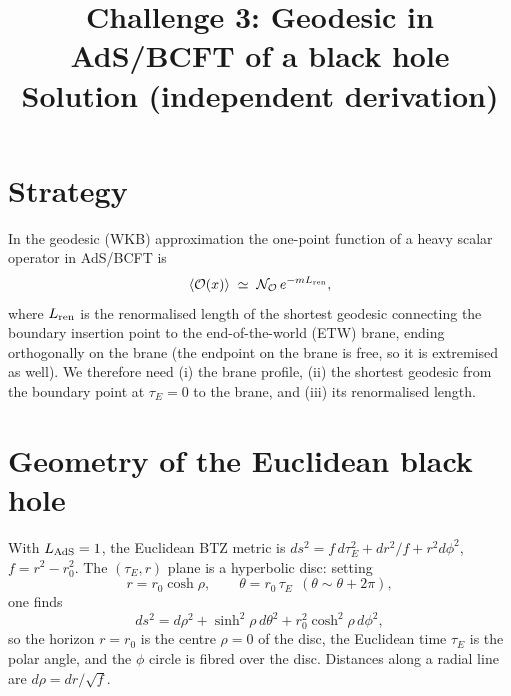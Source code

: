 \documentclass[11pt]{article}
\title{Challenge 3: Geodesic in AdS/BCFT of a black hole \\ \large Solution (independent derivation)}
\date{}
\begin{document}
\maketitle

\section{Strategy}
In the geodesic (WKB) approximation the one-point function of a heavy scalar operator in AdS/BCFT is
\begin{equation}
\langle\mathcal O(x)\rangle\;\simeq\;\mathcal N_{\mathcal O}\,e^{-m L_{\rm ren}},
\label{eq:wkb}
\end{equation}
where $L_{\rm ren}$ is the renormalised length of the shortest geodesic connecting the boundary insertion point to the end-of-the-world (ETW) brane, ending orthogonally on the brane (the endpoint on the brane is free, so it is extremised as well). We therefore need (i) the brane profile, (ii) the shortest geodesic from the boundary point at $\tau_E=0$ to the brane, and (iii) its renormalised length.

\section{Geometry of the Euclidean black hole}
With $L_{\rm AdS}=1$, the Euclidean BTZ metric is $ds^2=f\,d\tau_E^2+dr^2/f+r^2d\phi^2$, $f=r^2-r_0^2$. The $(\tau_E,r)$ plane is a hyperbolic disc: setting
\begin{equation}
r=r_0\cosh\rho,\qquad \theta=r_0\,\tau_E\ \ (\theta\sim\theta+2\pi),
\end{equation}
one finds
\begin{equation}
ds^2=d\rho^2+\sinh^2\!\rho\,d\theta^2+r_0^2\cosh^2\!\rho\,d\phi^2 ,
\end{equation}
so the horizon $r=r_0$ is the centre $\rho=0$ of the disc, the Euclidean time $\tau_E$ is the polar angle, and the $\phi$ circle is fibred over the disc. Distances along a radial line are $d\rho=dr/\sqrt{f}$.
\end{document}
